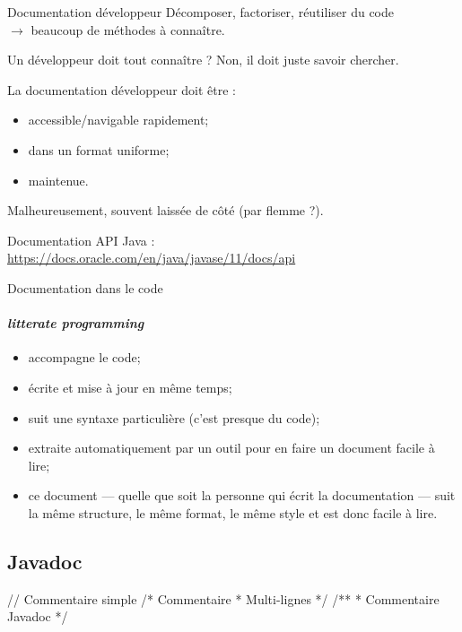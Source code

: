 \begin{hideedit}
\begin{frame}{Documentation développeur}
  Décomposer, factoriser, réutiliser du code\\
  \qquad \(\rightarrow\) beaucoup de méthodes à connaître.

  \pause
  Un développeur doit tout connaître ? \pause Non, il doit juste savoir
  chercher.

  \pause
  La documentation développeur doit être :
  \begin{itemize}[<+->]
    \item accessible/navigable rapidement;
    \item dans un format uniforme;
    \item maintenue.
  \end{itemize}

  \pause
  Malheureusement, souvent laissée de côté (par flemme ?).

  \pause
  Documentation API Java :\\
  \url{https://docs.oracle.com/en/java/javase/11/docs/api}


\end{frame}

\begin{frame}{Documentation dans le code}
  \framesubtitle{\textit{litterate programming}}
  \begin{itemize}[<+->]
    \item accompagne le code;
    \item écrite et mise à jour en même temps;
    \item suit une syntaxe particulière (c'est presque du code);
    \item extraite automatiquement par un outil pour en faire un document
      facile à lire;
    \item ce document --- quelle que soit la personne qui écrit la
      documentation --- suit la même structure, le même format, le même style
      et est donc facile à lire.
  \end{itemize}
\end{frame}

\subsection{Javadoc}
\begin{frame}[fragile]{}
  \begin{java}
    // Commentaire simple
    /* Commentaire
     * Multi-lignes */
    /**
     * Commentaire Javadoc
     */
  \end{java}


\end{frame}
\end{hideedit}
